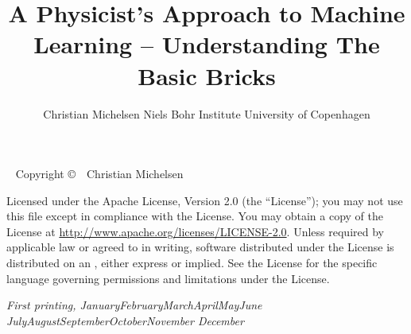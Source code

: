 \documentclass[a4paper, twoside]{tufte-book}
\title[A Physicist's Approach To Machine Learning -- Understanding The Basic Bricks]{A Physicist's \newline \noindent 
       Approach to \newline \noindent 
       Machine Learning \newline \noindent
       --  \newline \noindent
       Understanding  \newline \noindent
       The Basic Bricks}
\author[Christian Michelsen]{\newline \noindent 
        Christian Michelsen \newline \noindent 
        Niels Bohr Institute \newline \noindent 
        University of Copenhagen \newline }
\newcommand{\monthyear}{%
  \ifcase\month\or January\or February\or March\or April\or May\or June\or
  July\or August\or September\or October\or November\or
  December\fi\space\number\year
}
\newcommand{\blankpage}{\newpage\hbox{}\thispagestyle{empty}\newpage}
\begin{document}





\maketitle


\newpage
\begin{fullwidth}
~\vfill
\thispagestyle{empty}
\setlength{\parindent}{0pt}
\setlength{\parskip}{\baselineskip}
Copyright \copyright\ \the\year\ \newline Christian Michelsen

\par{}

\par Licensed under the Apache License, Version 2.0 (the ``License''); you may not
use this file except in compliance with the License. You may obtain a copy
of the License at \url{http://www.apache.org/licenses/LICENSE-2.0}. Unless
required by applicable law or agreed to in writing, software distributed
under the License is distributed on an , either express or implied. See the
License for the specific language governing permissions and limitations
under the License.

\par\textit{First printing, \monthyear}
\end{fullwidth}
\end{document}
